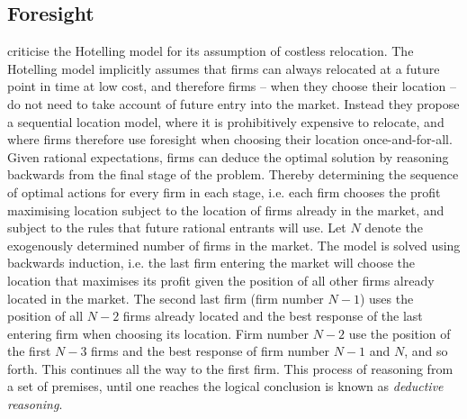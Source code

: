 \documentclass[preprint, 12pt]{elsarticle}
\begin{document}
\subsection{Foresight}

\citet{Prescott_Visscher_1977} criticise the Hotelling model for its assumption of costless relocation. The Hotelling model implicitly assumes that firms can always relocated at a future point in time at low cost, and therefore firms -- when they choose their location -- do not need to take account of future entry into the market. Instead they propose a sequential location model, where it is prohibitively expensive to relocate, and where firms therefore use foresight when choosing their location once-and-for-all. Given rational expectations, firms can deduce the optimal solution by reasoning backwards from the final stage of the problem. Thereby determining the sequence of optimal actions for every firm in each stage, i.e. each firm chooses the profit maximising location subject to the location of firms already in the market, and subject to the rules that future rational entrants will use. Let $N$ denote the exogenously determined number of firms in the market. The model is solved using backwards induction, i.e. the last firm entering the market will choose the location that maximises its profit given the position of all other firms already located in the market. The second last firm (firm number $N-1$) uses the position of all $N-2$ firms already located and the best response of the last entering firm when choosing its location. Firm number $N-2$ use the position of the first $N-3$ firms and the best response of firm number $N-1$ and $N$, and so forth. This continues all the way to the first firm. This process of reasoning from a set of premises, until one reaches the logical conclusion is known as \emph{deductive reasoning}.
\end{document}
